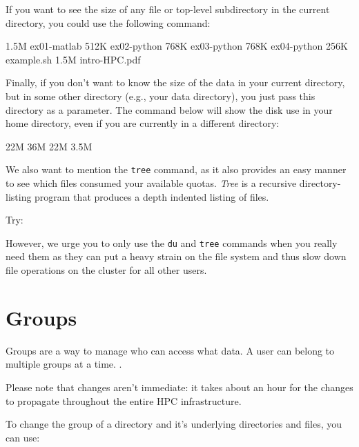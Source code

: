 If you want to see the size of any file or top-level subdirectory in the
current directory, you could use the following command:

\begin{prompt}
1.5M ex01-matlab
512K ex02-python
768K ex03-python
768K ex04-python
256K example.sh
1.5M intro-HPC.pdf
\end{prompt}


Finally, if you don't want to know the size of the data in your current
directory, but in some other directory (e.g., your data directory), you just
pass this directory as a parameter. The command below will show the disk use
in your home directory, even if you are currently in a different directory:

\begin{prompt}
22M %
36M %
22M %
3.5M %
\end{prompt}

\ifgent
\else
  We also want to mention the \texttt{tree} command, as it also provides an easy
  manner to see which files consumed your available quotas. \emph{Tree} is a
  recursive directory-listing program that produces a depth indented listing of
  files.

  Try:

\begin{prompt}
\end{prompt}

However, we urge you to only use the \texttt{du} and \texttt{tree} commands when you
really need them as they can put a heavy strain on the file system and thus
slow down file operations on the cluster for all other users.
\fi

\section{Groups}
\label{sec:vcs-groups}

Groups are a way to manage who can access what data. A user can belong to multiple
groups at a time. .

Please note that changes aren't immediate: it takes about an hour for the changes to propagate
throughout the entire HPC infrastructure.

To change the group of a directory and it's underlying directories and files, you can use:

